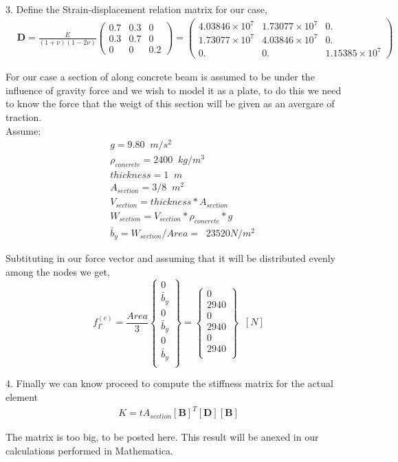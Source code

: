 \documentclass[a4paper]{memoir}
\begin{document}
3. Define the Strain-displacement relation matrix for our case,
\begin{align*}
	&\textbf{D} = \frac{E}{(1+\nu)(1-2\nu)}
	\left(
	\begin{array}{ccc}
	 0.7 & 0.3 & 0 \\
	 0.3 & 0.7 & 0 \\
	 0 & 0 & 0.2
	\end{array}
	\right)
	=
	\left(
	\begin{array}{ccc}
	 4.03846\times 10^7 & 1.73077\times 10^7 & 0. \\
	 1.73077\times 10^7 & 4.03846\times 10^7 & 0. \\
	 0. & 0. & 1.15385\times 10^7
	\end{array}
	\right)
\end{align*}

For our case a section of along concrete beam is assumed to be under the influence of gravity force and we wish to model it as a plate, to do this we need to know the force that the weigt of this section will be given as an avergare of traction.\\
Assume:
\begin{align*}
	& g = 9.80 \;\; m/s^2 \\
	& \rho_{concrete} = 2400 \;\; kg/m^3 \\
	& thickness = 1 \;\; m \\
	& A_{section} = 3/8 \;\; m^2 \\
	& V_{section} = thickness*A_{section} \\
	& W_{section} = V_{section}*\rho_{concrete}*g \\
	& \bar{b}_y = W_{section}/Area = \;\; 23520 N/m^2
\end{align*}

Subtituting in our force vector and assuming that it will be distributed evenly among the nodes we get,
\begin{equation}
f_{\Gamma}^{(e)} = 
	\frac{Area}{3}
	\begin{Bmatrix}
		0 \\
		\bar{b}_y \\
		0 \\
		\bar{b}_y \\
		0 \\
		\bar{b}_y \\
	\end{Bmatrix} 
	= 
	\begin{Bmatrix}
		0 \\
		2940 \\
		0 \\
		2940 \\
		0 \\
		2940 \\
	\end{Bmatrix} \;\; [N]
\end{equation}

4. Finally we can know proceed to compute the stiffness matrix for the actual element
\begin{align*}
	K = t A_{section}[\textbf{B}]^{T} [\textbf{D}] [\textbf{B}]
\end{align*}

The matrix is too big, to be posted here. This result will be anexed in our calculations performed in Mathematica.
\end{document}
